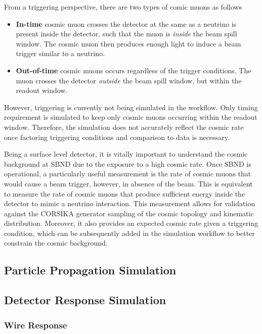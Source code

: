 From a triggering perspective, there are two types of comic muons as follows 
\begin{itemize}
	\item\textbf{In-time} cosmic muon crosses the detector at the same as a neutrino is present inside the detector, such that the muon is \textit{inside} the beam spill window. The cosmic muon then produces enough light to induce a beam trigger similar to a neutrino.
	\item\textbf{Out-of-time} cosmic muons occurs regardless of the trigger conditions. The muon crosses the detector \textit{outside} the beam spill window, but within the readout window.
\end{itemize}
However, triggering is currently not being simulated in the workflow. 
Only timing requirement is simulated to keep only cosmic muons occurring within the readout window.
Therefore, the simulation does not accurately reflect the cosmic rate once factoring triggering conditions and comparison to data is necessary. 

Being a surface level detector, it is vitally important to understand the cosmic background at SBND due to the exposure to a high cosmic rate.
Once SBND is operational, a particularly useful measurement is the rate of cosmic muons that would cause a beam trigger, however, in absence of the beam.
This is equivalent to measure the rate of cosmic muons that produce sufficient energy inside the detector to mimic a neutrino interaction.
This measurement allows for validation against the CORSIKA generator sampling of the cosmic topology and kinematic distribution. 
Moreover, it also provides an expected cosmic rate given a triggering condition, which can be subsequently added in the simulation workflow to better constrain the cosmic background.

\subsection{Particle Propagation Simulation}
\label{sec:gen_g4}

\subsection{Detector Response Simulation}
\label{sec:gen_response}

\subsubsection{Wire Response}

